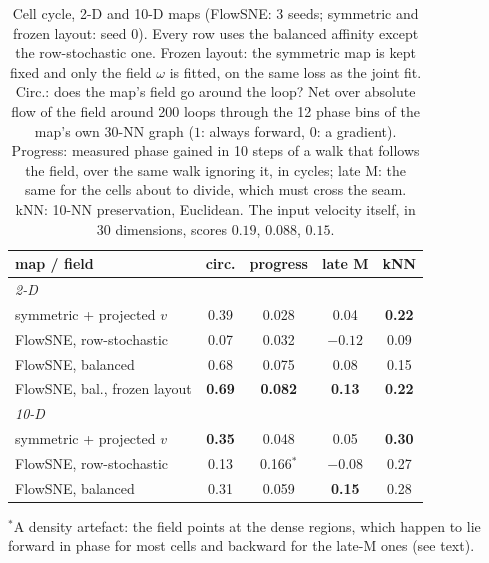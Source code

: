 \begin{table}[t]
  \caption{Cell cycle, 2-D and 10-D maps (FlowSNE: 3 seeds; symmetric and
  frozen layout: seed 0). Every row uses the balanced affinity except the
  row-stochastic one. Frozen layout: the symmetric map is kept fixed and
  only the field $\omega$ is fitted, on the same loss as the joint fit.
  Circ.: does the map's field go around the loop? Net over absolute flow of
  the field around 200 loops through the 12 phase bins of the map's own
  30-NN graph ($1$: always forward, $0$: a gradient). Progress: measured
  phase gained in 10 steps of a walk that follows the field, over the same
  walk ignoring it, in cycles; late M: the same for the cells about to
  divide, which must cross the seam. kNN: 10-NN preservation, Euclidean.
  The input velocity itself, in 30 dimensions, scores $0.19$, $0.088$,
  $0.15$.}
  \label{tab:rpe1}
  \centering
  \small
  \setlength{\tabcolsep}{4pt}
  \begin{tabular}{lcccc}
    \toprule
    map / field & circ. & progress & late M & kNN \\
    \midrule
    \multicolumn{5}{l}{\emph{2-D}} \\
    symmetric + projected $v$ & 0.39 & 0.028 & 0.04 & \textbf{0.22} \\
    FlowSNE, row-stochastic & 0.07 & 0.032 & $-0.12$ & 0.09 \\
    FlowSNE, balanced & 0.68 & 0.075 & 0.08 & 0.15 \\
    FlowSNE, bal., frozen layout & \textbf{0.69} & \textbf{0.082} & \textbf{0.13} & \textbf{0.22} \\
    \midrule
    \multicolumn{5}{l}{\emph{10-D}} \\
    symmetric + projected $v$ & \textbf{0.35} & 0.048 & 0.05 & \textbf{0.30} \\
    FlowSNE, row-stochastic & 0.13 & 0.166$^\ast$ & $-0.08$ & 0.27 \\
    FlowSNE, balanced & 0.31 & 0.059 & \textbf{0.15} & 0.28 \\
    \bottomrule
  \end{tabular}
  \par\smallskip\raggedright\footnotesize
  $^\ast$A density artefact: the field points at the dense regions, which
  happen to lie forward in phase for most cells and backward for the
  late-M ones (see text).
\end{table}

